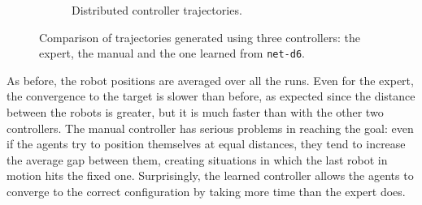\begin{figure}[!htb]
\begin{center}
\begin{subfigure}[h]{0.49\textwidth}
		\caption{Distributed controller trajectories.}
	\end{subfigure}
	\end{center}
	\caption[Evaluation of the trajectories learned by \texttt{net-d6}.]{Comparison 
	of trajectories generated using three controllers: the expert, the manual and 
	the one learned from \texttt{net-d6}.}
	\label{fig:net-d6traj}
\end{figure}
As before, the robot positions are averaged over all the runs. 
Even for the expert, the convergence to the target is slower than before, 
as expected since the distance between the robots is greater, but it is much faster 
than with the other two controllers.
The manual controller has serious problems in reaching the goal: even if the 
agents try to position themselves at equal distances, they tend to increase the 
average gap between them, creating situations in which the last robot in motion 
hits the fixed one. 
Surprisingly, the learned controller allows the agents to converge to the correct 
configuration by taking more time than the expert does.


